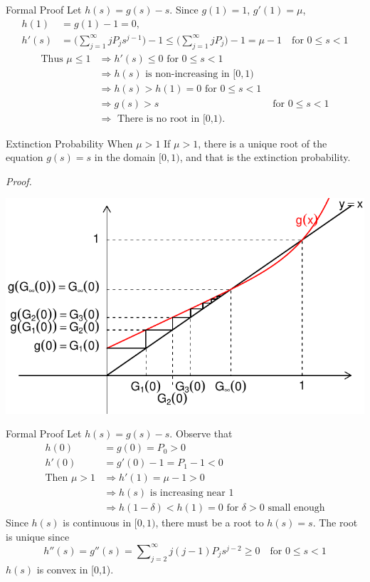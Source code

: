 \documentclass[letterpaper, mathserif]{beamer}
\def\Sum{\sum\nolimits}
\begin{document}
\begin{frame}{Formal Proof}
Let $h(s)=g(s)-s$. Since $g(1)=1$, $g'(1)=\mu$,
\begin{align*}
h(1)&=g(1)-1=0,\\
h'(s)&=\Big(\sum_{j=1}^{\infty}jP_js^{j-1}\Big)-1
   \le\Big(\sum_{j=1}^{\infty}jP_j\Big)-1=\mu-1 \quad\text{for }0\le s < 1
\end{align*}
\begin{align*}
\text{Thus }\mu\le 1
&\Rightarrow h'(s)\le0\text{ for }0\le s< 1\\
&\Rightarrow h(s)\text{ is non-increasing in }[0,1)\\
&\Rightarrow h(s)> h(1)=0\text{ for }0\le s < 1\\
&\Rightarrow g(s)>s&\text{ for }0\le s< 1\\
&\Rightarrow \text{ There is no root in [0,1)}.
\end{align*}
\end{frame}
\begin{frame}{Extinction Probability When $\mu>1$}
If $\mu>1$, there is a unique root of the equation $g(s)=s$ in the domain $[0,1)$,
and that is the extinction probability.\par\medskip
{\em Proof.}

\begin{center}
\includegraphics[width=\textwidth]{extinction.pdf}
\end{center}
\end{frame}
\begin{frame}{Formal Proof}
Let $h(s)=g(s)-s$. Observe that
\begin{align*}
h(0)&=g(0)=P_0> 0\\
h'(0)&=g'(0)-1=P_1-1<0\\
\text{Then }\mu > 1
&\Rightarrow h'(1)=\mu-1>0\\
&\Rightarrow h(s)\text{ is increasing near 1}\\
&\Rightarrow h(1-\delta)<h(1)=0\text{ for $\delta>0$ small enough}
\end{align*}
Since $h(s)$ is continuous in $[0,1)$, there must be a root to $h(s)=s$.
The root is unique since
$$
h''(s)=g''(s)=\Sum_{j=2}^{\infty}j(j-1)P_js^{j-2}\ge 0\quad\text{for }0\le s < 1
$$
$h(s)$ is convex in [0,1).
\end{frame}
\end{document}
